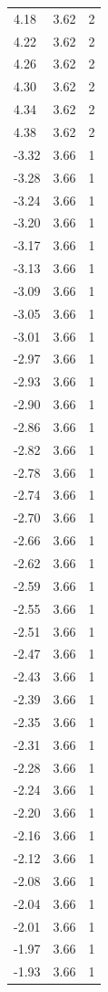 \begin{longtable}{lrr}
  4.18 & 3.62 & 2 \\
  4.22 & 3.62 & 2 \\
  4.26 & 3.62 & 2 \\
  4.30 & 3.62 & 2 \\
  4.34 & 3.62 & 2 \\
  4.38 & 3.62 & 2 \\
  -3.32 & 3.66 & 1 \\
  -3.28 & 3.66 & 1 \\
  -3.24 & 3.66 & 1 \\
  -3.20 & 3.66 & 1 \\
  -3.17 & 3.66 & 1 \\
  -3.13 & 3.66 & 1 \\
  -3.09 & 3.66 & 1 \\
  -3.05 & 3.66 & 1 \\
  -3.01 & 3.66 & 1 \\
  -2.97 & 3.66 & 1 \\
  -2.93 & 3.66 & 1 \\
  -2.90 & 3.66 & 1 \\
  -2.86 & 3.66 & 1 \\
  -2.82 & 3.66 & 1 \\
  -2.78 & 3.66 & 1 \\
  -2.74 & 3.66 & 1 \\
  -2.70 & 3.66 & 1 \\
  -2.66 & 3.66 & 1 \\
  -2.62 & 3.66 & 1 \\
  -2.59 & 3.66 & 1 \\
  -2.55 & 3.66 & 1 \\
  -2.51 & 3.66 & 1 \\
  -2.47 & 3.66 & 1 \\
  -2.43 & 3.66 & 1 \\
  -2.39 & 3.66 & 1 \\
  -2.35 & 3.66 & 1 \\
  -2.31 & 3.66 & 1 \\
  -2.28 & 3.66 & 1 \\
  -2.24 & 3.66 & 1 \\
  -2.20 & 3.66 & 1 \\
  -2.16 & 3.66 & 1 \\
  -2.12 & 3.66 & 1 \\
  -2.08 & 3.66 & 1 \\
  -2.04 & 3.66 & 1 \\
  -2.01 & 3.66 & 1 \\
  -1.97 & 3.66 & 1 \\
  -1.93 & 3.66 & 1 \\

\end{longtable}

